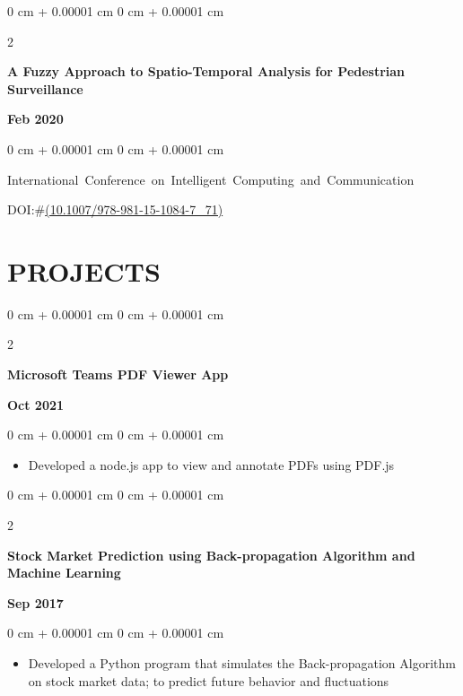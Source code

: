 \documentclass[10pt, letterpaper]{article}
\newenvironment{highlights}{
    \begin{itemize}[
        topsep=0.10 cm,
        parsep=0.10 cm,
        partopsep=0pt,
        itemsep=0pt,
        leftmargin=0 cm + 10pt
    ]
}{
    \end{itemize}
} %
\newenvironment{onecolentry}{
    \begin{adjustwidth}{
        0 cm + 0.00001 cm
    }{
        0 cm + 0.00001 cm
    }
}{
    \end{adjustwidth}
} %
\newenvironment{twocolentry}[2][]{
    \onecolentry
    \def\secondColumn{#2}
    \setcolumnwidth{\fill, 4.5 cm}
    \begin{paracol}{2}
}{
    \switchcolumn \raggedleft \secondColumn
    \end{paracol}
    \endonecolentry
} %
\begin{document}
        
        \begin{samepage}
            \begin{twocolentry}{
                \textbf{Feb 2020}
            }
                \textbf{A Fuzzy Approach to Spatio-Temporal Analysis for Pedestrian Surveillance}
            \end{twocolentry}

            \vspace{0.10 cm}
            
            \begin{onecolentry}
                \mbox{International Conference on Intelligent Computing and Communication}

                \vspace{0.10 cm}
                
        DOI:\#\href{https://doi.org/10.1007/978-981-15-1084-7_71}{(10.1007/978-981-15-1084-7\_71)}
        \end{onecolentry}
        \end{samepage}


    \vspace{0.10 cm}
    \section{PROJECTS}
\begin{twocolentry}
        {\textbf{Oct 2021}}
          \textbf{Microsoft Teams PDF Viewer App}  
        \end{twocolentry}

        \vspace{0.10 cm}
        \begin{onecolentry}
            \begin{highlights}
                \item Developed a node.js app to view and annotate PDFs using PDF.js
            \end{highlights}
        \end{onecolentry}

\vspace{0.10 cm}
        
        \begin{twocolentry}
        {\textbf{Sep 2017}}
            \textbf{Stock Market Prediction using Back-propagation Algorithm and Machine Learning}
        \end{twocolentry}
        \vspace{0.10 cm}
        \begin{onecolentry}
            \begin{highlights}
                \item Developed a Python program that simulates the Back-propagation Algorithm on stock market data; to predict future behavior and fluctuations
            \end{highlights}
        \end{onecolentry}
\end{document}
